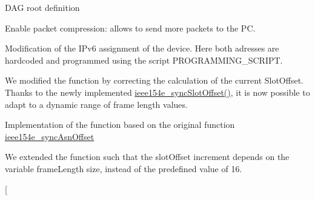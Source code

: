 \begin{DoxyRefList}
\item[\label{_l_k_n_code_edits__LKN_code_edits000004}%
\hypertarget{_l_k_n_code_edits__LKN_code_edits000004}{}%
Member \hyperlink{opendefs_8h_af6aaa0374ba3a63d8cac6f5396583f49}{D\+A\+G\+R\+O\+OT} ]D\+AG root definition  
\item[\label{_l_k_n_code_edits__LKN_code_edits000003}%
\hypertarget{_l_k_n_code_edits__LKN_code_edits000003}{}%
Member \hyperlink{group___open_serial_ga6499f570e793bb2111f482628e521a1b}{E\+N\+A\+B\+L\+E\+\_\+\+P\+K\+T\+\_\+\+C\+O\+M\+P\+R\+E\+S\+S\+I\+ON} ]Enable packet compression\+: allows to send more packets to the PC.  
\item[\label{_l_k_n_code_edits__LKN_code_edits000028}%
\hypertarget{_l_k_n_code_edits__LKN_code_edits000028}{}%
Member \hyperlink{group___i_d_manager_ga3e974443ae75269d00c3de03992a1669}{idmanager\+\_\+init} (void)]Modification of the I\+Pv6 assignment of the device. Here both adresses are hardcoded and programmed using the script P\+R\+O\+G\+R\+A\+M\+M\+I\+N\+G\+\_\+\+S\+C\+R\+I\+PT.  
\item[\label{_l_k_n_code_edits__LKN_code_edits000009}%
\hypertarget{_l_k_n_code_edits__LKN_code_edits000009}{}%
Member \hyperlink{_i_e_e_e802154_e_8c_aa42be4c16fe53e0460a63ae76438d668}{ieee154e\+\_\+process\+I\+Es} (\hyperlink{struct_open_queue_entry__t}{Open\+Queue\+Entry\+\_\+t} $\ast$pkt, uint16\+\_\+t $\ast$len\+IE)]We modified the function by correcting the calculation of the current Slot\+Offset. Thanks to the newly implemented \hyperlink{_i_e_e_e802154_e_8c_aee836d385fb2379dd04956ad7b3cfe37}{ieee154e\+\_\+sync\+Slot\+Offset()}, it is now possible to adapt to a dynamic range of frame length values.  
\item[\label{_l_k_n_code_edits__LKN_code_edits000015}%
\hypertarget{_l_k_n_code_edits__LKN_code_edits000015}{}%
Member \hyperlink{_i_e_e_e802154_e_8c_aee836d385fb2379dd04956ad7b3cfe37}{ieee154e\+\_\+sync\+Slot\+Offset} ()]Implementation of the function based on the original function \hyperlink{_i_e_e_e802154_e_8c_a8decad47b1e2b92bfc8a910f19d30ab3}{ieee154e\+\_\+sync\+Asn\+Offset}  
\item[\label{_l_k_n_code_edits__LKN_code_edits000014}%
\hypertarget{_l_k_n_code_edits__LKN_code_edits000014}{}%
Member \hyperlink{_i_e_e_e802154_e_8c_af7ddc5c9b10da0b029a6cdf13d40455d}{increment\+Asn\+Offset} ()]We extended the function such that the slot\+Offset increment depends on the variable frame\+Length size, instead of the predefined value of 16.  
\item[\label{_l_k_n_code_edits__LKN_code_edits000017}%

\end{DoxyRefList}
